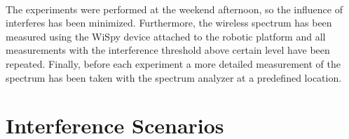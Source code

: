 \documentclass[11pt,a4paper,headinclude,footinclude,chapterprefix=on]{scrreprt}
\begin{document}
\paragraph{} The experiments were performed at the weekend afternoon, so the influence of interferes has been minimized. Furthermore, the wireless spectrum has been measured using the WiSpy device attached to the robotic platform and all measurements with the interference threshold above certain level have been repeated. Finally, before each experiment a more detailed measurement of the spectrum has been taken with the spectrum analyzer at a predefined location.

\section{Interference Scenarios}\label{sec:interference} 
\end{document}
